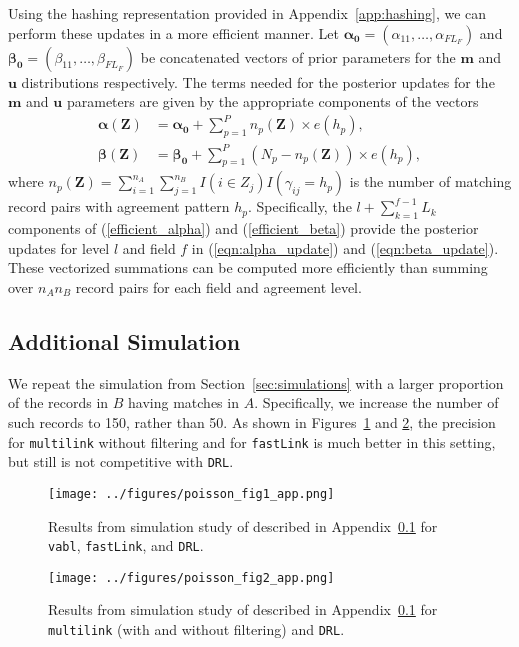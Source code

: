 \documentclass[12pt,letterpaper]{article}
\newcommand{\1}[1]{\mathbb{I}\!\left[#1\right]} %
\begin{document}
Using the hashing representation provided in Appendix~\ref{app:hashing}, we can perform these updates in a more efficient manner. Let $\bm{\alpha_0} = (\alpha_{11}, \ldots, \alpha_{F L_F})$ and $\bm{\beta_0}= (\beta_{11}, \ldots, \beta_{F L_F})$ be concatenated vectors of prior parameters for the $\bm{m}$ and $\bm{u}$ distributions respectively. The terms needed for the posterior updates for the $\bm{m}$ and $\bm{u}$ parameters are given by the appropriate components of the vectors
	\begin{align}
		\bm{\alpha(\bm{Z})} &= \bm{\alpha_0} + \sum_{p=1}^P n_p\left(\bm{Z} \right) \times e(h_p), \label{efficient_alpha} \\
		\bm{\beta(\bm{Z})} &= \bm{\beta_0} + \sum_{p=1}^P \left(N_p - n_p\left(\bm{Z}\right)\right) \times e(h_p), \label{efficient_beta}
	\end{align}
where $n_p(\bm{Z}) = \sum_{i = 1}^{n_A}\sum_{j = 1}^{n_B} I(i \in Z_{j}) I\left(\gamma_{ij} = h_p \right)$ is the number of matching record pairs with agreement pattern $h_p$. Specifically, the $l + \sum_{k=1}^{f-1} L_k$ components of (\ref{efficient_alpha}) and (\ref{efficient_beta}) provide the posterior updates for level $l$ and field $f$ in (\ref{eqn:alpha_update}) and (\ref{eqn:beta_update}). These vectorized summations can be computed more efficiently than summing over $n_A n_B$ record pairs for each field and agreement level.

\subsection{Additional Simulation}\label{app:simulation-2}

We repeat the simulation from Section~\ref{sec:simulations} with a larger proportion of the records in $B$ having matches in $A$. Specifically, we increase the number of such records to 150, rather than 50. As shown in Figures~\ref{fig:sim-vabl-comparison-2} and \ref{fig:sim-multilink-comparison-2}, the precision for \texttt{multilink} without filtering and for \texttt{fastLink} is much better in this setting, but still is not competitive with \texttt{DRL}. 

\begin{figure}[t]
	\centering
	\texttt{[image: ../figures/poisson\_fig1\_app.png]}
	\caption{Results from simulation study of described in Appendix~\ref{app:simulation-2} for \texttt{vabl}, \texttt{fastLink}, and \texttt{DRL}.}
	\label{fig:sim-vabl-comparison-2}
\end{figure}

\begin{figure}
	\centering
	\texttt{[image: ../figures/poisson\_fig2\_app.png]}
	\caption{Results from simulation study of described in Appendix~\ref{app:simulation-2} for \texttt{multilink} (with and without filtering) and \texttt{DRL}.}
	\label{fig:sim-multilink-comparison-2}
\end{figure}
\end{document}
